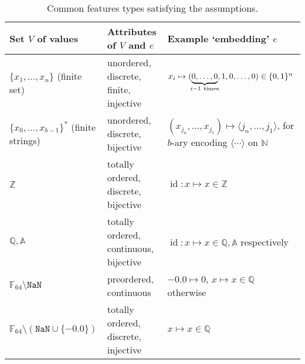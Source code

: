 \documentclass[a4paper,parskip=half]{article} %
\newcommand*\id{\operatorname{id}}
\begin{document}
\begin{table}[h]
\centering\small
\def\arraystretch{1.2}
\begin{tabular}{p{8.8em}|p{16em}|p{15.3em}}
Set $V$ of values & Attributes of $V$ and $e$ & Example `embedding' $e$
\\ \hline\hline
$\{x_1,\ldots,x_n\}$ \newline (finite set)
& unordered, discrete, finite, injective
& $x_i\mapsto(\underbrace{0,\ldots,0}_{\mathclap{i-1~\text{times}}},1,0,\ldots,0)\in\{0,1\}^n$
\\ \hline
$\{x_0,\ldots,x_{b-1}\}^*$ \newline (finite strings)
& \raggedright unordered, discrete, bijective
& %
  $(x_{j_n},\ldots,x_{j_1})\mapsto\langle j_n,\ldots,j_1\rangle$, \newline
  for $b$-ary encoding $\langle\cdots\rangle$ on $\mathbb N$
\\ \hline\hline
$\mathbb Z$
& \raggedright totally ordered, discrete, bijective %
& $\id:x\mapsto x\in\mathbb Z$
\\ \hline
$\mathbb Q,\mathbb A$
& \raggedright totally ordered, continuous, bijective %
& $\id:x\mapsto x\in\mathbb Q,\mathbb A$ respectively %
\\ \hline
$\mathbb F_{64}\setminus\mathtt{NaN}$
& \raggedright preordered, continuous %
& $-0.0\mapsto 0$, $x\mapsto x\in\mathbb Q$ otherwise
\\ \hline
$\mathbb F_{64}\setminus(\mathtt{NaN}\cup\{-0.0\})$
& \raggedright totally ordered, discrete, injective %
& $x\mapsto x\in\mathbb Q$
\end{tabular}
\caption{%
	Common features types satisfying the assumptions.
}
\label{tab:features}
\end{table}
\end{document}
